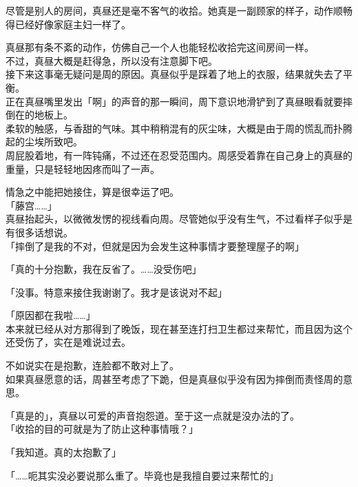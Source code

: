 尽管是别人的房间，真昼还是毫不客气的收拾。她真是一副顾家的样子，动作顺畅得已经好像家庭主妇一样了。

真昼那有条不紊的动作，仿佛自己一个人也能轻松收拾完这间房间一样。\\

不过，真昼大概是赶得急，所以没有注意脚下吧。\\

接下来这事毫无疑问是周的原因。真昼似乎是踩着了地上的衣服，结果就失去了平衡。\\

正在真昼嘴里发出「啊」的声音的那一瞬间，周下意识地滑铲到了真昼眼看就要摔倒在的地板上。\\

柔软的触感，与香甜的气味。其中稍稍混有的灰尘味，大概是由于周的慌乱而扑腾起的尘埃所致吧。\\

周屁股着地，有一阵钝痛，不过还在忍受范围内。周感受着靠在自己身上的真昼的重量，只是轻轻地因疼而叫了一声。

情急之中能把她接住，算是很幸运了吧。\\

「藤宫……」\\

真昼抬起头，以微微发愣的视线看向周。尽管她似乎没有生气，不过看样子似乎是有很多话想说。\\

「摔倒了是我的不对，但就是因为会发生这种事情才要整理屋子的啊」

「真的十分抱歉，我在反省了。……没受伤吧」

「没事。特意来接住我谢谢了。我才是该说对不起」

「原因都在我啦……」\\

本来就已经从对方那得到了晚饭，现在甚至连打扫卫生都过来帮忙，而且因为这个还受伤了，实在是难说过去。

不如说实在是抱歉，连脸都不敢对上了。\\

如果真昼愿意的话，周甚至考虑了下跪，但是真昼似乎没有因为摔倒而责怪周的意思。

「真是的」，真昼以可爱的声音抱怨道。至于这一点就是没办法的了。\\

「收拾的目的可就是为了防止这种事情哦？」

「我知道。真的太抱歉了」

「……呃其实没必要说那么重了。毕竟也是我擅自要过来帮忙的」\\


